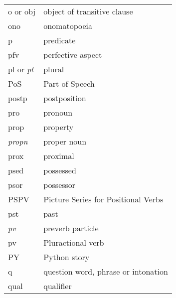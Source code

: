 \begin{tabular}{ll}
{\sc o} or {\sc obj} & object of transitive clause\\
 {\sc ono} & onomatopoeia \\

 
{\sc p}  & predicate\\
{\sc pfv} & perfective aspect \\%
{\sc pl} or {\it pl} &  plural \\
PoS & Part of Speech\\
 {\sc postp} & postposition \\
{\sc pro} & pronoun \\ %
 {\sc prop} & property  \\ %
 {\it propn} & proper noun  \\ %
 {\sc prox} & proximal \\
{\sc psed} & possessed\\ 
{\sc psor} & possessor\\
PSPV&  Picture Series for Positional Verbs \\
{\sc pst} & past  \\

 {\it pv} & preverb particle \\
 {\sc pv} &Pluractional verb \\

PY  & Python story\\
{\sc q} & question word, phrase or intonation\\
{\sc qual} &  qualifier\\
\end{tabular}

